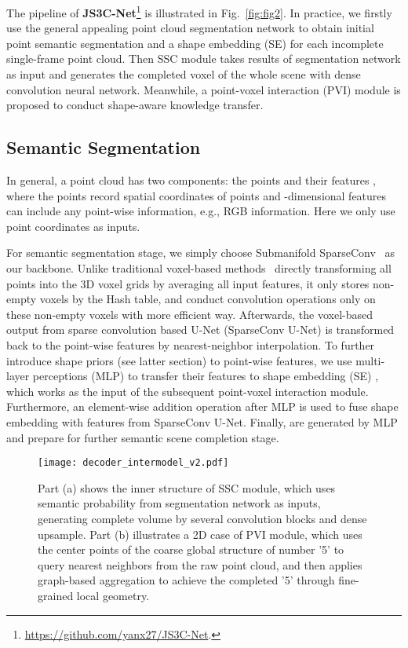 \documentclass[letterpaper]{article} \usepackage{aaai21}  \usepackage{times}  \usepackage{helvet} \usepackage{courier}  \usepackage[hyphens]{url}  \usepackage{graphicx} \urlstyle{rm} \def\UrlFont{\rm}  \usepackage{natbib}  \usepackage{booktabs}
\begin{document}
	The pipeline of {\textbf{JS3C-Net}\footnote{\url{https://github.com/yanx27/JS3C-Net}.}} is illustrated in Fig.~\ref{fig:fig2}. In practice, we firstly use the general appealing point cloud segmentation network to obtain initial point semantic segmentation and a shape embedding (SE) for each incomplete single-frame point cloud. 
Then SSC module takes results of segmentation network as input and generates the completed voxel of the whole scene with dense convolution neural network.
Meanwhile, a point-voxel interaction (PVI) module is proposed to conduct shape-aware knowledge transfer. 
	
	\subsection{Semantic Segmentation}
	
	In general, a point cloud has two components: the points  and their features , where the points record spatial coordinates of  points and -dimensional features can include any point-wise information, e.g., RGB information. 
Here we only use point coordinates as inputs.


	For semantic segmentation stage, we simply choose Submanifold SparseConv~\cite{SparseConv} as our backbone.
Unlike traditional voxel-based methods~\cite{ronneberger2015u,choy20194d} directly transforming all points into the 3D voxel grids by averaging all input features, it only stores non-empty voxels by the Hash table, and conduct convolution operations only on these non-empty voxels with more efficient way. 
Afterwards, the voxel-based output from sparse convolution based U-Net (SparseConv U-Net) is transformed back to the point-wise features  by nearest-neighbor interpolation. 
To further introduce shape priors (see latter section) to point-wise features, we use multi-layer perceptions (MLP) to transfer their features to shape embedding (SE) , which works as the input of the subsequent point-voxel interaction module. 
Furthermore, an element-wise addition operation after MLP is used to fuse shape embedding with features from SparseConv U-Net. 
Finally,  are generated by MLP and prepare for further semantic scene completion stage.
	
	\begin{figure*}[t]
		
		\noindent\texttt{[image: decoder\_intermodel\_v2.pdf]}
		
		\caption{Part (a) shows the inner structure of SSC module, which uses semantic probability from segmentation network as inputs, generating complete volume by several convolution blocks and dense upsample. Part (b) illustrates a 2D case of PVI module, which uses the center points of the coarse global structure of number '5' to query  nearest neighbors from the raw point cloud, and then applies graph-based aggregation to achieve the completed '5' through fine-grained local geometry.}
		\label{fig:fig3}
		
	\end{figure*}
	
\end{document}

